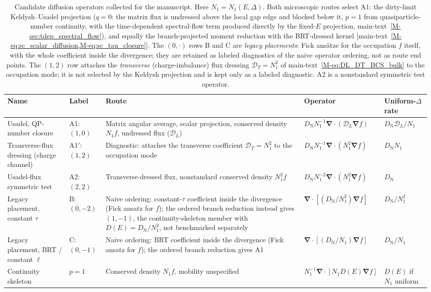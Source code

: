 \documentclass[
  aps,
  prb,
  preprint,
  superscriptaddress,
  longbibliography,
  nofootinbib
]{revtex4-2}
\newcommand{\bnabla}{\boldsymbol{\nabla}}
\newcommand{\DOS}{N_1}
\newcommand{\DN}{D_{\mathrm{N}}}
\newcommand{\DE}{D(E)}
\begin{document}
\begingroup
\squeezetable
\begin{table}[!tbp]
\caption{\label{tab:operator_taxonomy}Candidate diffusion operators collected
for the manuscript. Here \(\DOS=\DOS(E,\Delta)\). Both microscopic routes
select A1: the dirty-limit Keldysh--Usadel projection (\(q=0\): the matrix
flux is undressed above the local gap edge and blocked below it, \(p=1\)
from quasiparticle-number continuity, with the time-dependent
spectral-flow term produced directly by the fixed-\(E\) projection,
main-text~\cref{M-sec:tdep_spectral_flow}), and equally the branch-projected moment
reduction with the BRT-dressed kernel
[main-text~\cref{M-eq:sc_scalar_diffusion,M-eq:sc_tau_closure}]. The \((0,\cdot)\)
rows B and C are \emph{legacy placements}: Fick ans\"atze for the
occupation \(f\) itself, with the whole coefficient inside the
divergence; they are retained as labeled diagnostics of the naive
operator ordering, not as route end points. The \((1,2)\) row attaches
the \emph{transverse} (charge-imbalance) flux dressing
\(\mathcal{D}_T=\DOS^2\) of main-text~\cref{M-eq:DL_DT_BCS_bulk} to the occupation
mode; it is not selected by the Keldysh projection and is kept
only as a labeled diagnostic. A2 is a nonstandard symmetric test operator.}
\begin{ruledtabular}
\begin{tabular}{p{}p{}p{}p{}p{}}
Name & Label & Route & Operator & Uniform-\(\Delta\) rate \\
\hline
Usadel, QP-number closure & A1: \((1,0)\) &
Matrix angular average, scalar projection, conserved density \(\DOS f\),
undressed flux (\(\mathcal{D}_L\)) &
\(\DN\DOS^{-1}\bnabla\cdot(\mathcal{D}_L\bnabla f)\) &
\(\DN\mathcal{D}_L/\DOS\) \\
Transverse-flux dressing (charge channel) & A1\('\): \((1,2)\) &
Diagnostic: attaches the transverse coefficient
\(\mathcal{D}_T=\DOS^2\) to the occupation mode &
\(\DN\DOS^{-1}\bnabla\cdot(\DOS^2\bnabla f)\) &
\(\DN\DOS\) \\
Usadel-flux symmetric test & A2: \((2,2)\) &
Transverse-dressed flux, nonstandard conserved density \(\DOS^2 f\) &
\(\DN\DOS^{-2}\bnabla\cdot(\DOS^2\bnabla f)\) &
\(\DN\) \\
Legacy placement, constant \(\tau\) & B: \((0,-2)\) &
Naive ordering: constant-\(\tau\) coefficient inside the divergence
(Fick ansatz for \(f\)); the ordered branch reduction instead gives
\((1,-1)\), the continuity-skeleton member with \(\DE=\DN/\DOS^{2}\),
not benchmarked separately &
\(\bnabla\cdot[(\DN/\DOS^2)\bnabla f]\) &
\(\DN/\DOS^2\) \\
Legacy placement, BRT / constant \(\ell\) & C: \((0,-1)\) &
Naive ordering: BRT coefficient inside the divergence (Fick ansatz for
\(f\)); the ordered branch reduction gives A1 &
\(\bnabla\cdot[(\DN/\DOS)\bnabla f]\) &
\(\DN/\DOS\) \\
Continuity skeleton & \(p=1\) &
Conserved density \(\DOS f\), mobility unspecified &
\(\DOS^{-1}\bnabla\cdot[\DOS\DE\bnabla f]\) &
\(\DE\) if \(\DOS\) uniform \\
\end{tabular}
\end{ruledtabular}
\end{table}
\end{document}
